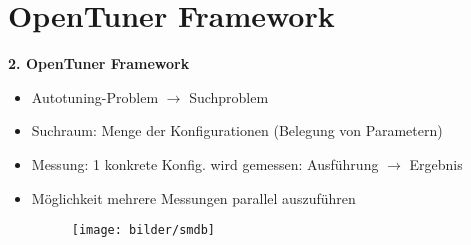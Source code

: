     
  
    
  \section{OpenTuner Framework} 
  
  \begin{frame}
  
  \textbf{2. OpenTuner Framework}
  \begin{itemize}
    \item Autotuning-Problem $\rightarrow$ Suchproblem
    \item Suchraum: Menge der Konfigurationen (Belegung von Parametern)
    \item Messung: 1 konkrete Konfig. wird gemessen: Ausführung $\rightarrow$ Ergebnis
    \item Möglichkeit mehrere Messungen parallel auszuführen
    
    \begin{figure}[ht]
      \centering	      
      \texttt{[image: bilder/smdb]}
      \label{smdb}
    \end{figure}

  \end{itemize}
  \end{frame}
    

